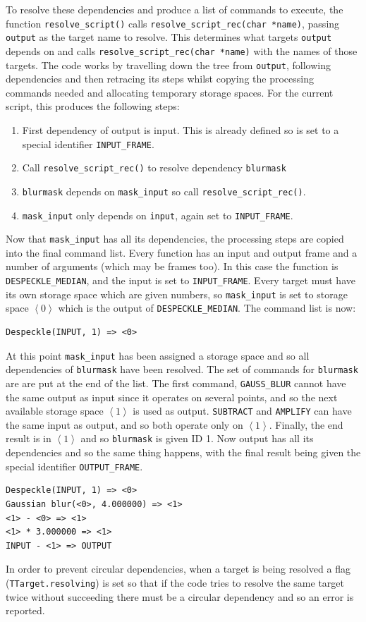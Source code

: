 \documentclass[12pt, a4paper]{article}
\begin{document}
To resolve these dependencies and produce a list of commands to execute, the
function \texttt{resolve\_script()} calls \texttt{resolve\_script\_rec(char *name)},
passing \texttt{output} as the target name to resolve. This determines what targets
\texttt{output} depends on and calls \texttt{resolve\_script\_rec(char *name)} with
the names of those targets. The code works by travelling down the tree from \texttt{output},
following dependencies and then retracing its steps whilst copying the processing commands
needed and allocating temporary storage spaces.
For the current script, this produces the following steps:
\begin{enumerate}
\item First dependency of {output} is {input}. This is already defined so is set to
a special identifier \texttt{INPUT\_FRAME}.
\item Call \texttt{resolve\_script\_rec()} to resolve dependency \texttt{blurmask}
\item \texttt{blurmask} depends on \texttt{mask\_input} so call \texttt{resolve\_script\_rec()}.
\item \texttt{mask\_input} only depends on \texttt{input}, again set to \texttt{INPUT\_FRAME}.
\end{enumerate}
Now that \texttt{mask\_input} has all its dependencies, the processing steps are copied
into the final command list. Every function has an input and output frame and a number of
arguments (which may be frames too). In this case the function is \texttt{DESPECKLE\_MEDIAN},
and the input is set to \texttt{INPUT\_FRAME}. Every target must have its own storage space
which are given numbers, so \texttt{mask\_input} is set to storage space $\left<0\right>$ which is
the output of \texttt{DESPECKLE\_MEDIAN}. The command list is now:
\begin{verbatim}
Despeckle(INPUT, 1) => <0>
\end{verbatim}
At this point \texttt{mask\_input} has been assigned a storage space and so all dependencies of
\texttt{blurmask} have been resolved. The set of commands for \texttt{blurmask} are
are put at the end of the list.
The first command, \texttt{GAUSS\_BLUR} cannot have the same output as input since it operates
on several points, and so the next available storage space $\left<1\right>$ is used as output.
\texttt{SUBTRACT} and \texttt{AMPLIFY} can have the same input as output, 
and so both operate only on $\left<1\right>$. Finally, the end result is in $\left<1\right>$
and so \texttt{blurmask} is given ID 1. Now output has all its dependencies and so the same
thing happens, with the final result being given the special identifier \texttt{OUTPUT\_FRAME}.
\begin{verbatim}
Despeckle(INPUT, 1) => <0>
Gaussian blur(<0>, 4.000000) => <1>
<1> - <0> => <1>
<1> * 3.000000 => <1>
INPUT - <1> => OUTPUT
\end{verbatim}
In order to prevent circular dependencies, when a target is being resolved a flag
(\texttt{TTarget.resolving}) is set so that if the code tries to resolve the same
target twice without succeeding there must be a circular dependency and so an error
is reported.
\end{document}
